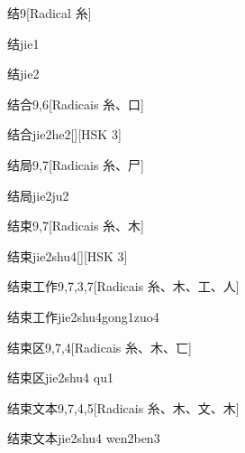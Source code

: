 \begin{entry}{结}{9}[Radical ⽷]
  \begin{phonetics}{结}{jie1}
  \end{phonetics}
  \begin{phonetics}{结}{jie2}
  \end{phonetics}
\end{entry}

\begin{entry}{结合}{9,6}[Radicais ⽷、⼝]
  \begin{phonetics}{结合}{jie2he2}[][HSK 3]
  \end{phonetics}
\end{entry}

\begin{entry}{结局}{9,7}[Radicais ⽷、⼫]
  \begin{phonetics}{结局}{jie2ju2}
  \end{phonetics}
\end{entry}

\begin{entry}{结束}{9,7}[Radicais ⽷、⽊]
  \begin{phonetics}{结束}{jie2shu4}[][HSK 3]
  \end{phonetics}
\end{entry}

\begin{entry}{结束工作}{9,7,3,7}[Radicais ⽷、⽊、⼯、⼈]
  \begin{phonetics}{结束工作}{jie2shu4gong1zuo4}
  \end{phonetics}
\end{entry}

\begin{entry}{结束区}{9,7,4}[Radicais ⽷、⽊、⼖]
  \begin{phonetics}{结束区}{jie2shu4 qu1}
  \end{phonetics}
\end{entry}

\begin{entry}{结束文本}{9,7,4,5}[Radicais ⽷、⽊、⽂、⽊]
  \begin{phonetics}{结束文本}{jie2shu4 wen2ben3}
  \end{phonetics}
\end{entry}


